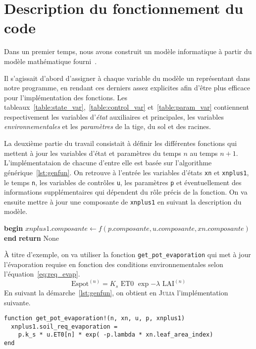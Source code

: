 \section{Description du fonctionnement du code}
Dans un premier temps, nous avons construit un modèle informatique à partir
du modèle mathématique fourni~\cite{lnas_model_wheat}.

Il s'agissait d'abord d'assigner à chaque variable du modèle un représentant
dans notre programme, en rendant ces derniers assez explicites
afin d'être plus efficace pour l'implémentation des fonctions.
Les tableaux~\ref{table:state_var},~\ref{table:control_var} et~\ref{table:param_var}
contiennent respectivement les variables d'\emph{état} auxiliaires et principales, 
les variables \emph{environnementales} et les \emph{paramètres} de la tige, du sol et des racines.

La deuxième partie du travail consistait à définir les différentes fonctions
qui mettent à jour les variables d'état et paramètres du 
temps $n$ au temps $n+1$.
L'implémentataion de chacune d'entre elle est basée sur l'algorithme générique~\ref{lst:genfun}.
On retrouve à l'entrée les variables d'états \texttt{xn} et \texttt{xnplus1},
le temps \texttt{n}, les variables de contrôles \texttt{u}, les paramètres \texttt{p}
et éventuellement des informations supplémentaires qui dépendent
du rôle précis de la fonction.
On va ensuite mettre à jour une composante de \lstinline{xnplus1}
en suivant la description du modèle.

\begin{algorithm}[t]
  \caption{Algorithme générique qui sert de base pour l'implémentation
des fonctions. La fonction $f$ n'est pas définie mais sert de placeholder
pour représenter les opérations nécessaires à la mise à jour de \lstinline|xnplus1|.}
\label{lst:genfun}
  \begin{algorithmic}[1]
    \State \textbf{begin}
      \State $xnplus1.composante \gets f(p.composante, u.composante, xn.composante)$
    \State \textbf{end}
    \State \textbf{return} None
    \EndProcedure
  \end{algorithmic}
\end{algorithm}


À titre d'exemple, on va utiliser la fonction \lstinline|get_pot_evaporation| qui met
à jour l'évaporation requise en fonction des conditions environnementales
selon l'équation~\ref{eq:req_evap}.
\begin{equation}
  \text{Espot}^{(n)} = K_s \text{ ET0 } \exp{-\lambda \text{ LAI}^{(n)}}
  \label{eq:req_evap}
\end{equation}
En suivant la démarche~\ref{lst:genfun}, on obtient en \textsc{Julia}
l'implémentation suivante.
\begin{lstlisting}
function get_pot_evaporation!(n, xn, u, p, xnplus1)
  xnplus1.soil_req_evaporation = 
    p.k_s * u.ET0[n] * exp( -p.lambda * xn.leaf_area_index) 
end
\end{lstlisting}



